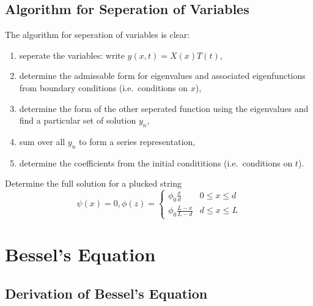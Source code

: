 \documentclass[a4paper]{article}
\begin{document}
\subsection{Algorithm for Seperation of Variables}

The algorithm for seperation of variables is clear:
\begin{enumerate}
\item seperate the variables: write \(y(x,t)=X(x)T(t)\),
\item determine the admissable form for eigenvalues and associated eigenfunctions from boundary conditions (i.e.\ conditions on \(x\)),
\item determine the form of the other seperated function using the eigenvalues and find a particular set of solution \(y_n\),
\item sum over all \(y_n\) to form a series representation,
\item determine the coefficients from the initial condititions (i.e.\ conditions on \(t\)).
\end{enumerate}

\begin{ex}
  Determine the full solution for a plucked string
  \[
    \psi(x) =0, \phi(z) =
    \begin{cases}
      \phi_0\frac{x}{d} & 0 \leq x \leq d \\
      \phi_0\frac{L-x}{L-d} & d \leq x \leq L
    \end{cases}
  \]
\end{ex}

\section{Bessel's Equation}

\subsection{Derivation of Bessel's Equation}

\label{subsec:derivation of Bessel}
\end{document}
